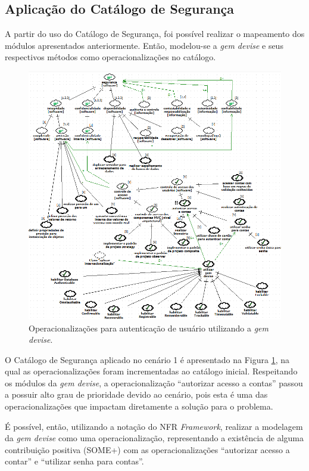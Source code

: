 \subsection{Aplicação do Catálogo de Segurança}

A partir do uso do Catálogo de Segurança, foi possível realizar o mapeamento dos módulos apresentados anteriormente. Então, modelou-se a \textit{gem devise} e seus respectivos métodos como operacionalizações no catálogo. 

\pagebreak

\begin{figure}[h!]
	\centering
	\includegraphics[keepaspectratio=true,scale=0.7]{figuras/catalogoPersona1.PNG}
	\caption{Operacionalizações para autenticação de usuário utilizando a \textit{gem devise}.}
	\label{catalogoPersona1}
\end{figure}


O Catálogo de Segurança aplicado no cenário 1 é apresentado na Figura \ref{catalogoPersona1}, na qual as operacionalizações foram incrementadas ao catálogo inicial. Respeitando os módulos da \textit{gem devise}, a operacionalização  “autorizar acesso a contas” passou a possuir alto grau de prioridade devido ao cenário, pois esta é uma das operacionalizações que impactam diretamente a solução para o problema. 

É possível, então, utilizando a notação do NFR \textit{Framework}, realizar a modelagem da \textit{gem devise} como uma operacionalização, representando a existência de alguma contribuição positiva (SOME+) com as operacionalizações  “autorizar acesso a contar” e “utilizar senha para contas”.
 
